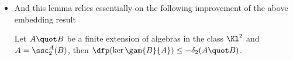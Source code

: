 \documentclass[a4paper,11pt,german,english]{report}
\begin{document}
\begin{itemize}

\item[]And this lemma relies essentially on the following improvement of the above
embedding result
\begin{teo*}
Let $A\quot B$ be a finite extension of algebras in the class $\Kl^{2}$ and $A=\ssc_{2}^{A}(B)$, then %
$\dfp(\ker\gam{B}{A})\leq-\delta_{2}(A\quot B)$.
\end{teo*}


\end{itemize}
\end{document}
